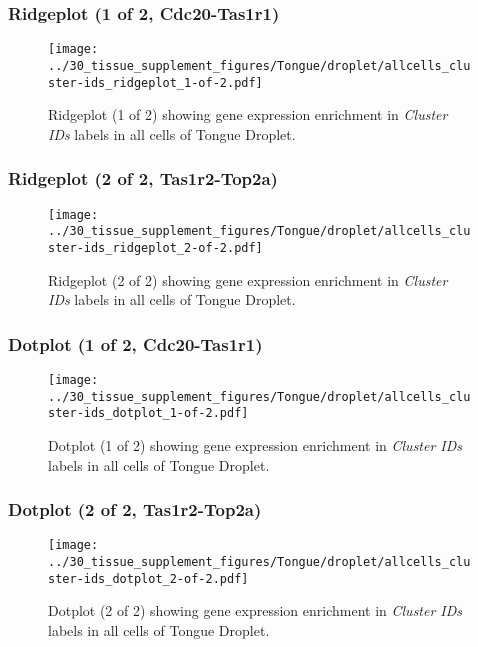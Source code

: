 \clearpage

\subsubsection{Ridgeplot (1 of 2, Cdc20-Tas1r1)}
\begin{figure}[h]
\centering
\texttt{[image: ../30\_tissue\_supplement\_figures/Tongue/droplet/allcells\_cluster-ids\_ridgeplot\_1-of-2.pdf]}

\caption{ Ridgeplot (1 of 2)  showing gene expression enrichment in \emph{Cluster IDs} labels in all cells of Tongue Droplet. }
\end{figure}


\clearpage

\subsubsection{Ridgeplot (2 of 2, Tas1r2-Top2a)}
\begin{figure}[h]
\centering
\texttt{[image: ../30\_tissue\_supplement\_figures/Tongue/droplet/allcells\_cluster-ids\_ridgeplot\_2-of-2.pdf]}

\caption{ Ridgeplot (2 of 2)  showing gene expression enrichment in \emph{Cluster IDs} labels in all cells of Tongue Droplet. }
\end{figure}


\clearpage

\subsubsection{Dotplot (1 of 2, Cdc20-Tas1r1)}
\begin{figure}[h]
\centering
\texttt{[image: ../30\_tissue\_supplement\_figures/Tongue/droplet/allcells\_cluster-ids\_dotplot\_1-of-2.pdf]}

\caption{ Dotplot (1 of 2)  showing gene expression enrichment in \emph{Cluster IDs} labels in all cells of Tongue Droplet. }
\end{figure}


\clearpage

\subsubsection{Dotplot (2 of 2, Tas1r2-Top2a)}
\begin{figure}[h]
\centering
\texttt{[image: ../30\_tissue\_supplement\_figures/Tongue/droplet/allcells\_cluster-ids\_dotplot\_2-of-2.pdf]}

\caption{ Dotplot (2 of 2)  showing gene expression enrichment in \emph{Cluster IDs} labels in all cells of Tongue Droplet. }
\end{figure}


